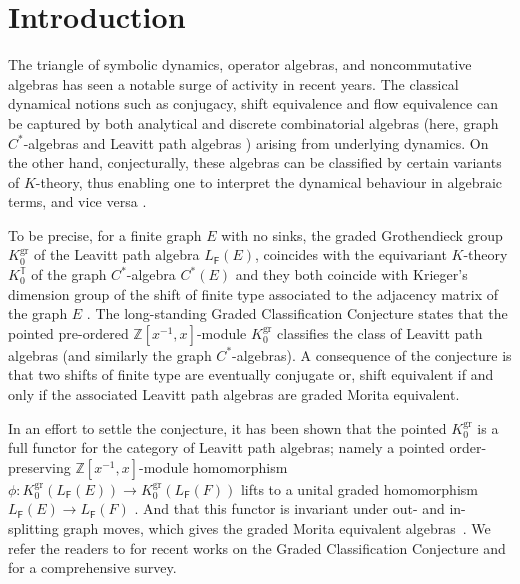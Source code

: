 \documentclass[12pt]{amsart}
\theoremstyle{definition}
\theoremstyle{remark}
\newcommand{\gr}{\operatorname{gr}}
\begin{document}
\maketitle

\tableofcontents


\section{Introduction}\label{sec intro}
The triangle of symbolic dynamics, operator algebras, and noncommutative algebras has seen a notable surge of activity in recent years. The classical dynamical notions such as conjugacy, shift equivalence  and flow equivalence can be captured  by both analytical and discrete combinatorial algebras (here, graph $C^*$-algebras \cite{KPR} and Leavitt path algebras \cite{Abrams-Monograph, Ara}) arising from underlying dynamics. On the other hand, conjecturally,  these algebras can be classified by certain variants of $K$-theory, thus enabling one to interpret the dynamical behaviour in algebraic terms, and vice versa \cite{willie, eilersxyz}.

To be precise, for a finite graph $E$ with no sinks,  the graded Grothendieck group $K_0^{\gr}$ of the Leavitt path algebra $L_\mathsf{F}(E)$, coincides with the equivariant $K$-theory $K_0^{\mathbb T}$ of the graph $C^*$-algebra $C^*(E)$ and they both coincide with Krieger's dimension group of the shift of finite type associated to the adjacency matrix of the graph $E$ \cite{Hazrat-main, Lind-Marcus}. The long-standing Graded Classification Conjecture states that the pointed pre-ordered $\mathbb Z[x^{-1}, x]$-module $K_0^{\gr}$ classifies the class of Leavitt path algebras (and similarly the graph $C^*$-algebras). A consequence of the conjecture is that two shifts of finite type are eventually conjugate or, shift equivalent if and only if the associated Leavitt path algebras are graded Morita equivalent. 

In an effort to settle the conjecture, it has been shown that the pointed $K_0^{\gr}$ is a full functor for the category of Leavitt path algebras; namely a pointed order-preserving $\mathbb Z[x^{-1},x]$-module homomorphism $\phi:K_0^{\gr}(L_\mathsf{F}(E)) \rightarrow K_0^{\gr}(L_\mathsf{F}(F))$ lifts to a unital graded homomorphism  $L_\mathsf{F}(E)\rightarrow L_\mathsf{F}(F)$ \cite{Arnone, Vas}. And that this functor is invariant under out- and in-splitting graph moves, which gives the graded Morita equivalent algebras~\cite{Cordeiro}. We refer the readers to \cite{ART, AraPardo2014, Arnone, guidohom, guidowillie, Bock, Brix, bilich, eilers, Vas, Vasdisjoint} for recent works on the Graded Classification Conjecture and \cite{willie} for a comprehensive survey. 
\end{document}
